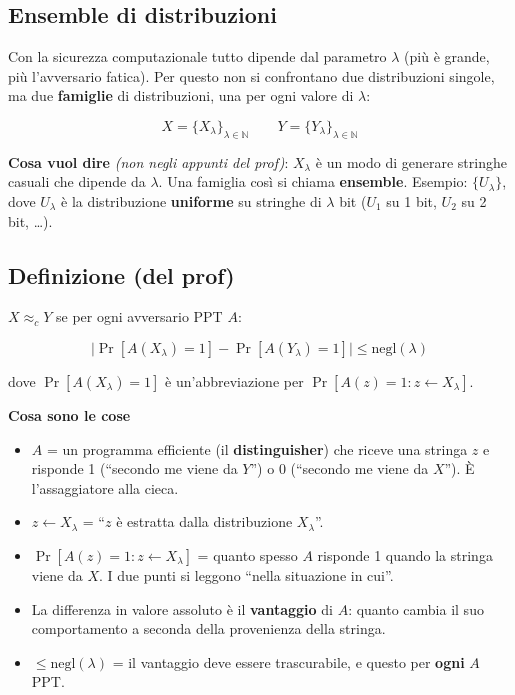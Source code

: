 \subsection{Ensemble di distribuzioni}

Con la sicurezza computazionale tutto dipende dal parametro \(\lambda\) (più è grande, più l'avversario fatica). Per questo non si confrontano due distribuzioni singole, ma due \textbf{famiglie} di distribuzioni, una per ogni valore di \(\lambda\):

\[
X = \{X_\lambda\}_{\lambda \in \mathbb{N}} \qquad Y = \{Y_\lambda\}_{\lambda \in \mathbb{N}}
\]

\begin{nota}

\textbf{Cosa vuol dire} \emph{(non negli appunti del prof)}: \(X_\lambda\) è un modo di generare stringhe casuali che dipende da \(\lambda\). Una famiglia così si chiama \textbf{ensemble}. Esempio: \(\{U_\lambda\}\), dove \(U_\lambda\) è la distribuzione \textbf{uniforme} su stringhe di \(\lambda\) bit (\(U_1\) su 1 bit, \(U_2\) su 2 bit, \ldots).

\end{nota}

\subsection{Definizione (del prof)}

\(X \approx_c Y\) se per ogni avversario PPT \(A\):

\[
\Big| \Pr[A(X_\lambda) = 1] - \Pr[A(Y_\lambda) = 1] \Big| \le \text{negl}(\lambda)
\]

dove \(\Pr[A(X_\lambda) = 1]\) è un'abbreviazione per \(\Pr[A(z) = 1 : z \leftarrow X_\lambda]\).

\begin{nota}

\textbf{Cosa sono le cose}

\begin{itemize}
\tightlist
\item
  \(A\) = un programma efficiente (il \textbf{distinguisher}) che riceve una stringa \(z\) e risponde 1 (``secondo me viene da \(Y\)'') o 0 (``secondo me viene da \(X\)''). È l'assaggiatore alla cieca.
\item
  \(z \leftarrow X_\lambda\) = ``\(z\) è estratta dalla distribuzione \(X_\lambda\)''.
\item
  \(\Pr[A(z) = 1 : z \leftarrow X_\lambda]\) = quanto spesso \(A\) risponde 1 quando la stringa viene da \(X\). I due punti si leggono ``nella situazione in cui''.
\item
  La differenza in valore assoluto è il \textbf{vantaggio} di \(A\): quanto cambia il suo comportamento a seconda della provenienza della stringa.
\item
  \(\le \text{negl}(\lambda)\) = il vantaggio deve essere trascurabile, e questo per \textbf{ogni} \(A\) PPT.
\end{itemize}

\end{nota}

